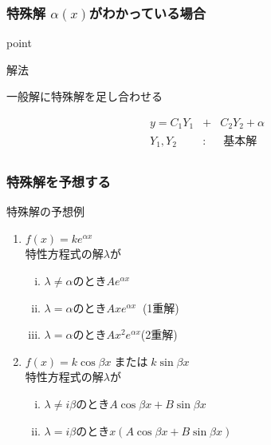\documentclass[a4paper]{jsarticle}
\begin{document}
\subsubsection{特殊解 $\alpha\left(x\right)$がわかっている場合}
\begin{itembox}[l]{point}
    \begin{center}
    \end{center}
\end{itembox}
\begin{itembox}[l]{解法}
    \begin{center}
        一般解に特殊解を足し合わせる
    \end{center}
    \begin{eqnarray*}
        y=C_1Y_1&+&C_2Y_2+\alpha\\
        Y_1,Y_2\;&:&\;基本解\\
    \end{eqnarray*}
\end{itembox}
\subsubsection{特殊解を予想する}
\begin{itembox}[l]{特殊解の予想例}
    \begin{enumerate}[(1)]
        \item $f\left(x\right)=ke^{\alpha x}$\\
              特性方程式の解$\lambda$が
              \begin{enumerate}[(i)]
                  \item $\lambda \neq \alpha$\quad のとき\quad$Ae^{\alpha x}$
                  \item $\lambda = \alpha$\quad のとき\quad$Axe^{\alpha x}\;\;$\quad(1重解)
                  \item $\lambda = \alpha$\quad のとき\quad$Ax^2e^{\alpha x}$\quad(2重解)
              \end{enumerate}
        \item $f\left(x\right)=k\cos\beta x\;$または$\;k\sin\beta x$\\
              特性方程式の解$\lambda$が
              \begin{enumerate}[(i)]
                  \item $\lambda \neq i\beta$\quad のとき\quad$A\cos\beta x+B\sin\beta x$
                  \item $\lambda = i\beta$\quad のとき\quad$x\left(A\cos\beta x+B\sin\beta x\right)$
              \end{enumerate}
    \end{enumerate}
\end{itembox}
\end{document}
